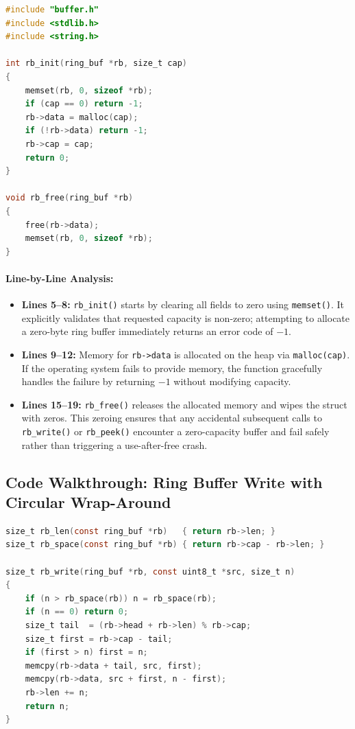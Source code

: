 \begin{lstlisting}[language=C]
#include "buffer.h"
#include <stdlib.h>
#include <string.h>

int rb_init(ring_buf *rb, size_t cap)
{
    memset(rb, 0, sizeof *rb);
    if (cap == 0) return -1;
    rb->data = malloc(cap);
    if (!rb->data) return -1;
    rb->cap = cap;
    return 0;
}

void rb_free(ring_buf *rb)
{
    free(rb->data);
    memset(rb, 0, sizeof *rb);
}
\end{lstlisting}

\paragraph{Line-by-Line Analysis:}
\begin{itemize}[leftmargin=1.5em]
    \item \textbf{Lines 5--8:} \texttt{rb\_init()} starts by clearing all fields to zero using \texttt{memset()}. It explicitly validates that requested capacity is non-zero; attempting to allocate a zero-byte ring buffer immediately returns an error code of $-1$.
    \item \textbf{Lines 9--12:} Memory for \texttt{rb->data} is allocated on the heap via \texttt{malloc(cap)}. If the operating system fails to provide memory, the function gracefully handles the failure by returning $-1$ without modifying capacity.
    \item \textbf{Lines 15--19:} \texttt{rb\_free()} releases the allocated memory and wipes the struct with zeros. This zeroing ensures that any accidental subsequent calls to \texttt{rb\_write()} or \texttt{rb\_peek()} encounter a zero-capacity buffer and fail safely rather than triggering a use-after-free crash.
\end{itemize}

\subsection{Code Walkthrough: Ring Buffer Write with Circular Wrap-Around}

\begin{lstlisting}[language=C]
size_t rb_len(const ring_buf *rb)   { return rb->len; }
size_t rb_space(const ring_buf *rb) { return rb->cap - rb->len; }

size_t rb_write(ring_buf *rb, const uint8_t *src, size_t n)
{
    if (n > rb_space(rb)) n = rb_space(rb);
    if (n == 0) return 0;
    size_t tail  = (rb->head + rb->len) % rb->cap;
    size_t first = rb->cap - tail;
    if (first > n) first = n;
    memcpy(rb->data + tail, src, first);
    memcpy(rb->data, src + first, n - first);
    rb->len += n;
    return n;
}
\end{lstlisting}

